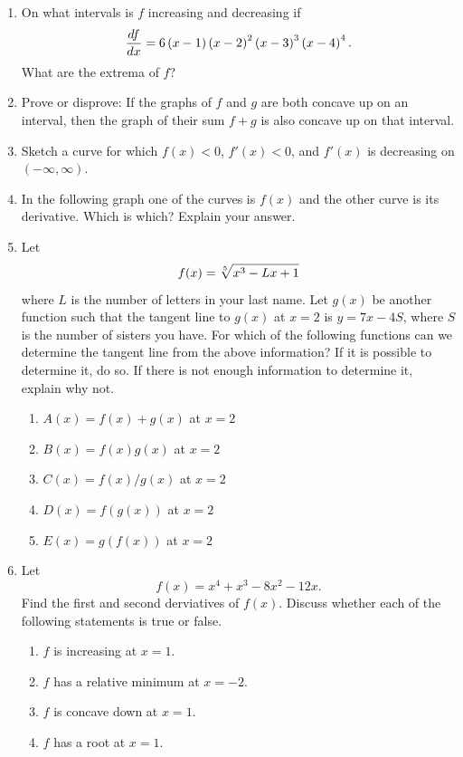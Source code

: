 \begin{enumerate}
\item  On what intervals is $f$ increasing and decreasing if $${{df} \over {dx}} = 6\left( {x - 1} \right)\left( {x - 2} \right)^2 \left( {x - 3} \right)^3 \left( {x - 4} \right)^4 .$$  What are the extrema of $f$?  \cite{FWG}

\item  Prove or disprove:  If the graphs of $f$ and $g$ are both concave up on an interval, then the graph of their sum $f + g$ is also concave up on that interval.  \cite{SBS}

\item  Sketch a curve for which $f(x) < 0$, $f'(x)< 0$, and $f'(x)$ is decreasing on $(-\infty, \infty)$.

\item  In the following graph one of the curves is $f(x)$ and the other curve is its derivative.  Which is which?  Explain your answer. 

\item  Let $$f(x) = \root 5 \of {x^3  - Lx + 1} $$ where $L$ is the number of letters in your last name.  Let $g(x)$ be another function such that the tangent line to $g(x)$ at $x = 2$ is $y = 7x - 4S$, where $S$ is the number of sisters you have.  For which of the following functions can we determine the tangent line from the above information?  If it is possible to determine it, do so.  If there is not enough information to determine it, explain why not. \cite{FWG}
\begin{enumerate}
	\item $A(x) = f(x) + g(x)$ at $x = 2$ 
	\item $B(x) = f(x) g(x)$ at $x = 2$
	\item $C(x) = f(x)/g(x)$ at $x = 2$ 
	\item $D(x) = f(g(x))$ at $x = 2$
	\item $E(x) = g(f(x))$ at $x = 2$
\end{enumerate}

\item  Let $$f(x) = x^4  + x^3  - 8x^2  - 12x.$$  Find the first and second derviatives of $f(x)$.  Discuss whether each of the following statements is true or false. \begin{enumerate}
\item $f$ is increasing at $x = 1$.
\item $f$ has a relative minimum at $x = -2$.
\item $f$ is concave down at $x = 1$.
\item $f$ has a root at $x = 1$.  \cite{SMo}\end{enumerate} 


\end{enumerate}

